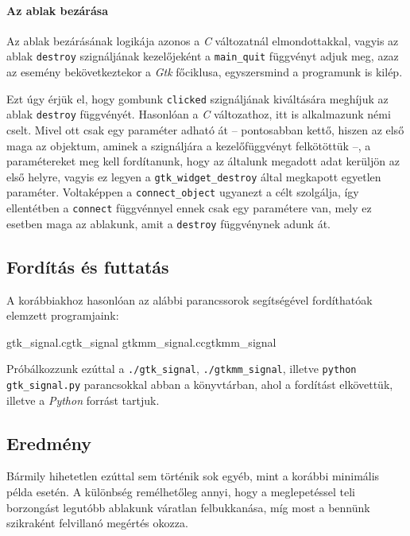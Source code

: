 \paragraph{Az ablak bezárása}

\begin{description}
 \item[\ref{gtksignalpy:connectdestroy}. sor] Az ablak bezárásának logikája azonos a \textit{C}  változatnál elmondottakkal, vagyis az ablak \texttt{destroy} szignáljának kezelőjeként a \texttt{main\_quit} függvényt adjuk meg, azaz az esemény bekövetkeztekor a \textit{Gtk} főciklusa, egyszersmind a programunk is kilép.

 \item[\ref{gtksignalpy:signaldestroy}. sor] Ezt úgy érjük el, hogy gombunk \texttt{clicked} szignáljának kiváltására meghíjuk az ablak \texttt{destroy} függvényét. Hasonlóan a \textit{C} változathoz, itt is alkalmazunk némi cselt. Mivel ott csak egy paraméter adható át -- pontosabban kettő, hiszen az első maga az objektum, aminek a szignáljára a kezelőfüggvényt felkötöttük --, a paramétereket meg kell fordítanunk, hogy az általunk megadott adat kerüljön az első helyre, vagyis ez legyen a \texttt{gtk\_widget\_destroy} által megkapott egyetlen paraméter. Voltaképpen a \texttt{connect\_object} ugyanezt a célt szolgálja, így ellentétben a \texttt{connect} függvénnyel ennek csak egy paramétere van, mely ez esetben maga az ablakunk, amit a \texttt{destroy} függvénynek adunk át.
\end{description}

\subsection{Fordítás és futtatás}

A korábbiakhoz hasonlóan az alábbi parancssorok segítségével fordíthatóak elemzett programjaink:

\lstcompiles
{gtk_signal.c}{gtk_signal}
{gtkmm_signal.cc}{gtkmm_signal}

Próbálkozzunk ezúttal a \texttt{./gtk\_signal}, \texttt{./gtkmm\_signal}, illetve \texttt{python gtk\_signal.py} parancsokkal abban a könyvtárban, ahol a fordítást elkövettük, illetve a \textit{Python} forrást tartjuk.

\subsection{Eredmény}

Bármily hihetetlen ezúttal sem történik sok egyéb, mint a korábbi minimális példa esetén. A különbség remélhetőleg annyi, hogy a meglepetéssel teli borzongást legutóbb ablakunk váratlan felbukkanása, míg most a bennünk szikraként felvillanó megértés okozza.
